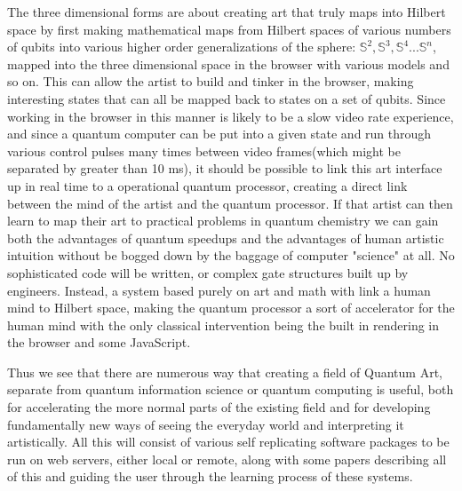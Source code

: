 \documentclass[11pt]{article}
\begin{document}
    The three dimensional forms are about creating art that truly maps into Hilbert space by first making mathematical maps from Hilbert spaces of various numbers of qubits into various higher order generalizations of the sphere: $\mathbb{S}^2, \mathbb{S}^3,\mathbb{S}^4...\mathbb{S}^n$, mapped into the three dimensional space in the browser with various models and so on.  This can allow the artist to build and tinker in the browser, making interesting states that can all be mapped back to states on a set of qubits.  Since working in the browser in this manner is likely to be a slow video rate experience, and since a quantum computer can be put into a given state and run through various control pulses many times between video frames(which might be separated by greater than 10 ms), it should be possible to link this art interface up in real time to a operational quantum processor, creating a direct link between the mind of the artist and the quantum processor.  If that artist can then learn to map their art to practical problems in quantum chemistry we can gain both the advantages of quantum speedups and the advantages of human artistic intuition without be bogged down by the baggage of computer "science" at all.  No sophisticated code will be written, or complex gate structures built up by engineers.  Instead, a system based purely on art and math with link a human mind to Hilbert space, making the quantum processor a sort of accelerator for the human mind with the only classical intervention being the built in rendering in the browser and some JavaScript.





    Thus we see that there are numerous way that creating a field of Quantum Art, separate from quantum information science or quantum computing is useful, both for accelerating the more normal parts of the existing field and for developing fundamentally new ways of seeing the everyday world and interpreting it artistically.  All this will consist of various self replicating software packages to be run on web servers, either local or remote, along with some papers describing all of this and guiding the user through the learning process of these systems. 
\end{document}
